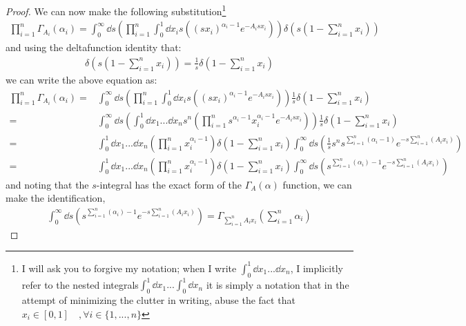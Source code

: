 \documentclass[a4paper,twoside]{article}
\begin{document}
\begin{proof}
We can now make the following substitution\footnote{I will ask you to forgive my notation; when I write $\int_{0}^{1} \dd{x_{1}}...\dd{x_{n}}$, I implicitly refer to the nested integrals$\int_{0}^{1} \dd{x_{1}}...\int_{0}^{1}\dd{x_{n}}$ it is simply a notation that in the attempt of minimizing the clutter in writing, abuse the fact that $x_{i} \in [0, 1] \quad,\forall i \in \{1, ... , n\} $}
\begin{align*}
\prod_{i=1}^{n}\Gamma_{A_{i}}(\alpha_{i}) 
= \int_{0}^{\infty} \dd{s} \left( \prod_{i=1}^{n} \int_{0}^{1} \dd{x_{i}} s \left( (s x_{i})^{\alpha_{i} - 1} e^{-A_{i}s x_{i}} \right) \right) \delta \left(s \left(1 - \sum_{i=1}^{n}x_{i} \right) \right) 
\end{align*}
and using the deltafunction identity that:
\begin{align*}
\delta \left(s \left(1 - \sum_{i=1}^{n}x_{i} \right) \right) = \frac{1}{s}\delta \left(1 - \sum_{i=1}^{n}x_{i} \right)
\end{align*}
we can write the above equation as:
\begin{align*}
\prod_{i=1}^{n}\Gamma_{A_{i}}(\alpha_{i}) 
=& \int_{0}^{\infty} \dd{s} \left( \prod_{i=1}^{n} \int_{0}^{1} \dd{x_{i}} s \left( (s x_{i})^{\alpha_{i} - 1} e^{-A_{i}s x_{i}} \right) \right) \frac{1}{s} \delta \left(1 - \sum_{i=1}^{n}x_{i} \right) \\
=& \int_{0}^{\infty} \dd{s} \left( \int_{0}^{1} \dd{x_{1}}...\dd{x_{n}} s^{n} \left( \prod_{i=1}^{n} s^{\alpha_{i} - 1} x_{i}^{\alpha_{i} - 1} e^{-A_{i}s x_{i}} \right) \right) \frac{1}{s} \delta \left(1 - \sum_{i=1}^{n}x_{i}\right) \\
=&  \int_{0}^{1} \dd{x_{1}}...\dd{x_{n}} \left( \prod_{i=1}^{n} x_{i}^{\alpha_{i} - 1} \right) \delta \left(1 - \sum_{i=1}^{n}x_{i}\right) 
\int_{0}^{\infty} \dd{s} \left( \frac{1}{s} s^{n} s^{\sum_{i=1}^{n}(\alpha_{i} - 1)} e^{-s\sum_{i=1}^{n}(A_{i} x_{i})} \right) \\
=&  \int_{0}^{1} \dd{x_{1}}...\dd{x_{n}} \left( \prod_{i=1}^{n} x_{i}^{\alpha_{i} - 1} \right) \delta \left(1 - \sum_{i=1}^{n}x_{i}\right) 
\int_{0}^{\infty} \dd{s} \left( s^{\sum_{i=1}^{n}(\alpha_{i}) - 1} e^{-s\sum_{i=1}^{n}(A_{i} x_{i})} \right)
\end{align*}
and noting that the $s$-integral has the exact form of the $\Gamma_{A}(\alpha)$ function, we can make the identification, 
\begin{align*}
\int_{0}^{\infty} \dd{s} \left( s^{\sum_{i=1}^{n}(\alpha_{i}) - 1} e^{-s\sum_{i=1}^{n}(A_{i} x_{i})} \right) 
= \Gamma_{\sum_{i=1}^{n}A_{i}x_{i}} \left( \sum_{i=1}^{n} \alpha_{i} \right) 

\end{align*}
\end{proof}
\end{document}
